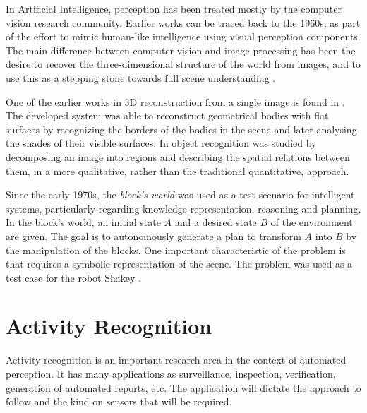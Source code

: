 In Artificial Intelligence, perception has been treated mostly by the computer vision research community.
Earlier works can be traced back to the 1960s, as part of the effort to mimic human-like intelligence using visual perception components. The main difference between computer vision and image processing has been the desire to recover the three-dimensional structure of the world from images, and to use this as a stepping stone towards full scene understanding \citep{Winston1975_PsyCV}. 


One of the earlier works in 3D reconstruction from a single image is found in \citep{Roberts1963_PhDThesis}.
The developed system was able to reconstruct geometrical bodies with flat surfaces by recognizing the borders of the bodies in the scene and later analysing the shades of their visible surfaces.
In \citep{Barrow1971_RelatDesc} object recognition was studied by decomposing an image into regions and describing the spatial relations between them, in a more qualitative, rather than the traditional quantitative, approach.

Since the early 1970s, the \textit{block's world} was used as a test scenario for intelligent systems, particularly regarding knowledge representation, reasoning and planning.
In the block's world, an initial state $A$ and a desired state $B$  of the environment are given.
The goal is to autonomously generate a plan to transform $A$ into $B$ by the manipulation of the blocks.
One important characteristic of the problem is that requires a symbolic representation of the scene.
The problem was used as a test case for the robot Shakey \citep{Nilsson84_Shakey}.




\section{Activity Recognition} 

Activity recognition is an important research area in the context of automated perception. 
It has many applications as surveillance, inspection, verification, generation of automated reports, etc.
The application will dictate the approach to follow and the kind on sensors that will be required.

